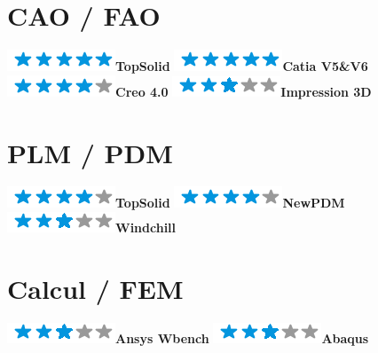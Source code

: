 \documentclass[]{friggeri-cv}
\begin{document}
\begin{aside}
\section{CAO / FAO}
\includegraphics[scale=0.40]{res/img/5stars.png}\hspace{1.5mm}\textbf{TopSolid}
\includegraphics[scale=0.40]{res/img/5stars.png}\hspace{1.5mm}\textbf{Catia V5\&V6}
\includegraphics[scale=0.40]{res/img/4stars.png}\hspace{1.5mm}\textbf{Creo 4.0}
\includegraphics[scale=0.40]{res/img/3stars.png}\hspace{1.5mm}\textbf{Impression 3D}\section{PLM / PDM}
\includegraphics[scale=0.40]{res/img/4stars.png}\hspace{1.5mm}\textbf{TopSolid}
\includegraphics[scale=0.40]{res/img/4stars.png}\hspace{1.5mm}\textbf{NewPDM}
\includegraphics[scale=0.40]{res/img/3stars.png}\hspace{1.5mm}\textbf{Windchill}\section{Calcul / FEM}
\includegraphics[scale=0.40]{res/img/3stars.png}\hspace{1.5mm}\textbf{Ansys Wbench}
\includegraphics[scale=0.40]{res/img/3stars.png}\hspace{1.5mm}\textbf{Abaqus}

\end{aside}
\end{document}
